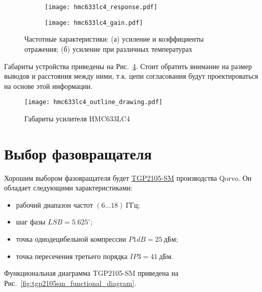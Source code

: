 \begin{figure}[!ht]
    \centering
    \begin{subfigure}[b]{0.45\textwidth}
        \centering
        \texttt{[image: hmc633lc4\_response.pdf]}
        \caption{}%
        \label{fig:hmc633lc4_response}
    \end{subfigure}
    \hfill
    \begin{subfigure}[b]{0.45\textwidth}
        \centering
        \texttt{[image: hmc633lc4\_gain.pdf]}
        \caption{}%
        \label{fig:hmc633lc4_gain}
    \end{subfigure}
    \caption{%
        Частотные характеристики:
        (а) усиление и коэффициенты отражения;
        (б) усиление при различных температурах
    }%
    \label{fig:hmc633lc4_responses}
\end{figure}

Габариты устройства приведены на Рис.~\ref{fig:hmc633lc4_outline_drawing}.
Стоит обратить внимание на размер выводов и расстояния между ними, т.к. цепи согласования будут проектироваться на основе этой информации.

\begin{figure}[!ht]
    \centering
    \texttt{[image: hmc633lc4\_outline\_drawing.pdf]}
    \caption{Габариты усилителя HMC633LC4}%
    \label{fig:hmc633lc4_outline_drawing}
\end{figure}

\section{Выбор фазовращателя}

Хорошим выбором фазовращателя будет \href{https://www.qorvo.com/products/p/TGP2105-SM}{TGP2105-SM} производства Qorvo.
Он обладает следующими характеристиками:
\begin{itemize}
    \item
        рабочий диапазон частот $(6 \ldots 18)~\text{ГГц}$;
    \item
        шаг фазы $LSB = 5.625^\circ$;
    \item
        точка однодецибельной компрессии $P1dB = 25~\text{дБм}$;
    \item
        точка пересечения третьего порядка $IP3 = 41~\text{дБм}$.
\end{itemize}

Функциональная диаграмма TGP2105-SM приведена на Рис.~\ref{fig:tgp2105sm_functional_diagram}.

